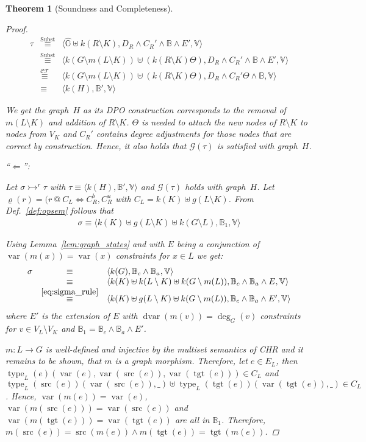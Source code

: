 \documentclass{tlp}
\newtheorem{theorem}{Theorem}\newtheorem{corollary}[theorem]{Corollary}
\newcommand{\st}[3]{\ensuremath{\langle #1 , #2 , #3 \rangle}}
\newcommand{\CT}{\ensuremath{\mathcal{CT}}}
\newcommand{\mcG}{\ensuremath{\mathcal{G}}}
\newcommand{\bbB}{\ensuremath{\mathbb{B}}}
\newcommand{\bbBca}{\ensuremath{\bbB_c \land \bbB_a}}
\newcommand{\bbG}{\ensuremath{\mathbb{G}}}
\newcommand{\bbV}{\ensuremath{\mathbb{V}}}
\newcommand{\der}{\ensuremath{\rightarrowtail}}
\DeclareMathOperator{\var}{var}
\DeclareMathOperator{\dvar}{dvar}
\DeclareMathOperator{\type}{type}
\DeclareMathOperator{\src}{src}
\DeclareMathOperator{\tgt}{tgt}
\newcommand{\chrrule}{\ensuremath{\varrho}}
\newcommand{\eqct}{\ensuremath{\stackrel{\CT}{\equiv}}}
\newcommand{\eqsubst}{\ensuremath{\stackrel{\text{Subst}}{\equiv}}}
\begin{document}
\begin{theorem}[Soundness and Completeness]
\begin{proof}
\[
\begin{array}{lcl}
\tau & \eqsubst & \st{\hat{\bbG} \uplus k(R \setminus K)}{D_R \land C_R' \land
\bbB \land E'}{\bbV} \\
& \eqsubst & \st{k(G \setminus m(L \setminus K)) \uplus
(k(R\setminus K) \Theta)}{D_R \land C_R' \land \bbB \land E'}{\bbV}\\
& \eqct & \st{k(G \setminus m(L \setminus K)) \uplus
(k(R\setminus K) \Theta)}{D_R \land C_R'\Theta \land \bbB}{\bbV}\\
& \equiv & \st{k(H)}{\bbB'}{\bbV}
\end{array}\]

We get the graph~$H$ as its DPO construction corresponds to the removal of $m(L
\setminus K)$ and addition of $R\setminus K$. $\Theta$ is needed to attach the
new nodes of $R \setminus K$ to nodes from $V_K$ and $C_R'$ contains degree
adjustments for those nodes that are correct by construction. Hence, it also
holds that $\mcG(\tau)$ is satisfied with graph~$H$.

\vskip1cm
``$\Longleftarrow$'':

Let $\sigma \der^r \tau$ with $\tau \equiv \st{k(H)}{\bbB'}{\bbV}$ and
$\mcG(\tau)$ holds with graph~$H$. Let $\chrrule(r) = (r\ @\ C_L \Leftrightarrow
C_R^b,C_R^u$ with $C_L = k(K) \uplus g(L \setminus K)$. From Def.~\ref{def:opsem}
follows that
\begin{eqnarray} \label{eq:sigma_rule}
\sigma \equiv \st{k(K) \uplus g(L
\setminus K) \uplus k(G \setminus L)}{\bbB_1}{\bbV}
\end{eqnarray}

Using Lemma~\ref{lem:graph_states} and with $E$ being a conjunction of
$\var(m(x)) = \var(x)$ constraints for $x \in L$ we get: \[
\begin{array}{lcl}
\sigma & \equiv & \st{k(G)}{\bbBca}{\bbV} \\
& \equiv & \st{k(K) \uplus k(L \setminus K) \uplus k(G\setminus m(L))}{\bbBca
\land E}{\bbV} \\
& \stackrel{\eqref{eq:sigma_rule}}{\equiv} & \st{k(K) \uplus g(L \setminus K)
\uplus k(G \setminus m(L))}{\bbBca \land E'}{\bbV}
\end{array}\]
where $E'$ is the extension of $E$ with $\dvar(m(v)) = \deg_G(v)$ constraints
for $v \in V_L \setminus V_K$ and $\bbB_1 = \bbBca \land E'$.

$m: L \rightarrow G$ is well-defined and injective by the multiset semantics of
CHR and it remains to be shown, that $m$ is a graph morphism. Therefore, let $e
\in E_L$, then $\type_L(e)(\var(e), \var(\src(e)), \var(\tgt(e))) \in C_L$ and
$\type_L(\src(e))(\var(\src(e)), \_) \uplus \type_L(\tgt(e))(\var(\tgt(e)), \_)
\in C_L$. Hence, $\var(m(e)) = \var(e)$, $\var(m(\src(e))) = \var(\src(e))$ and
$\var(m(\tgt(e))) = \var(\tgt(e))$ are all in $\bbB_1$. Therefore, $m(\src(e)) =
\src(m(e)) \land m(\tgt(e)) = \tgt(m(e))$.


\end{proof}
\end{theorem}
\end{document}
